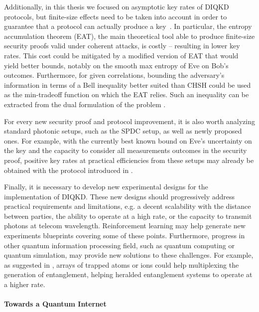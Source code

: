 Additionally, in this thesis we focused on asymptotic key rates of DIQKD protocols, but finite-size effects need to be taken into account in order to guarantee that a protocol can actually produce a key~\cite{Tan2021}.
In particular, the entropy accumulation theorem (EAT), the main theoretical tool able to produce finite-size security proofs valid under coherent attacks, is costly -- resulting in lower key rates.
This cost could be mitigated by a modified version of EAT that would yield better bounds, notably on the smooth max entropy of Eve on Bob's outcomes.
Furthermore, for given correlations, bounding the adversary's information in terms of a Bell inequality better suited than CHSH could be used as the min-tradeoff function on which the EAT relies.
Such an inequality can be extracted from the dual formulation of the problem .

\medbreak

For every new security proof and protocol improvement, it is also worth analyzing standard photonic setups, such as the SPDC setup, as well as newly proposed ones.
For example, with the currently best known bound on Eve's uncertainty on the key and the capacity to consider all measurements outcomes in the security proof, positive key rates at practical efficiencies from these setups may already be obtained with the protocol introduced in \cite{Brown2021}.

\medbreak 

Finally, it is necessary to develop new experimental designs for the implementation of DIQKD.
These new designs should progressively address practical requirements and limitations, e.g. a decent scalability with the distance between parties, the ability to operate at a high rate, or the capacity to transmit photons at telecom wavelength.
Reinforcement learning may help generate new experiments blueprints covering some of these points.
Furthermore, progress in other quantum information processing field, such as quantum computing or quantum simulation, may provide new solutions to these challenges.
For example, as suggested in \cite{Zapatero2023}, arrays of trapped atoms or ions could help multiplexing the generation of entanglement, helping heralded entanglement systems to operate at a higher rate.

\paragraph{Towards a Quantum Internet}

